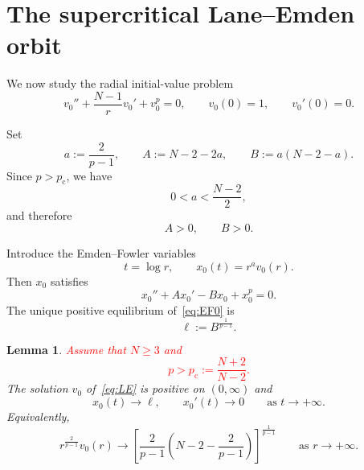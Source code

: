 \documentclass[11pt]{article}
\newcommand{\pc}{p_{\mathrm c}}
\newtheorem{lemma}[theorem]{Lemma}
\theoremstyle{definition}
\begin{document}
  
\section{The supercritical Lane--Emden orbit}

We now study the radial initial-value problem
\begin{equation}
\label{eq:LE}
v_0''
+\frac{N-1}{r}v_0'
+v_0^p
=0,
\qquad
v_0(0)=1,
\qquad
v_0'(0)=0.
\end{equation}

Set
\begin{equation}
\label{eq:aAB}
a:=\frac{2}{p-1},
\qquad
A:=N-2-2a,
\qquad
B:=a(N-2-a).
\end{equation}
Since $p>\pc$, we have
\[
0<a<\frac{N-2}{2},
\]
and therefore
\[
A>0,
\qquad
B>0.
\]

Introduce the Emden--Fowler variables
\[
t=\log r,
\qquad
x_0(t)=r^a v_0(r).
\]
Then $x_0$ satisfies
\begin{equation}
\label{eq:EF0}
x_0''
+Ax_0'
-Bx_0
+x_0^p
=0.
\end{equation}
The unique positive equilibrium of~\eqref{eq:EF0} is
\begin{equation}
\label{eq:ell}
\ell
:=
B^{\frac1{p-1}}.
\end{equation}

\begin{lemma}
\label{lem:LEasymptotics}
\textcolor{red}{Assume that $N\geq3$ and
\[
p>\pc:=\frac{N+2}{N-2}.
\]}
The solution $v_0$ of~\eqref{eq:LE} is positive on $(0,\infty)$ and
\[
x_0(t)\longrightarrow\ell,
\qquad
x_0'(t)\longrightarrow0
\qquad
\text{as }t\to+\infty.
\]
Equivalently,
\begin{equation}
\label{eq:LE-tail}
r^{\frac2{p-1}}v_0(r)
\longrightarrow
\left[
\frac2{p-1}
\left(
N-2-\frac2{p-1}
\right)
\right]^{\frac1{p-1}}
\qquad
\text{as }r\to+\infty.
\end{equation}
\end{lemma}
\end{document}
